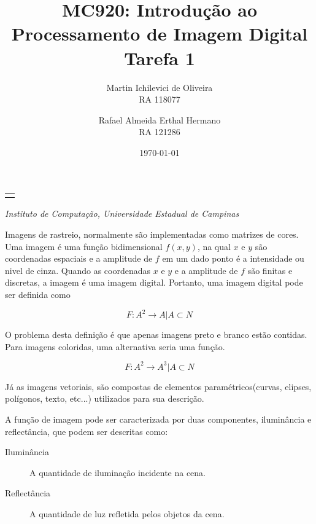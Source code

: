 \documentclass[10pt,a4paper]{article}
\makeatletter
\let\@institution\empty
\def\institution#1{\def\@institution{#1}}
\renewcommand{\maketitle}{
\begin{center}
  {\Large\bfseries\@title\par\medskip}
  {\large
   \begin{tabular}[t]{c}%
     \@author
   \end{tabular}\par\medskip}
  {\itshape\@institution\par}
  {\itshape\@date\par}
\end{center}}
\makeatother
\begin{document}

\title{MC920: Introdução ao Processamento de Imagem Digital\\Tarefa 1}
\author{
  \begin{minipage}{6cm}
  \centering
   Martin Ichilevici de Oliveira\\
   RA 118077
  \end{minipage}
   \and
  \begin{minipage}{6cm}
   \centering
   Rafael Almeida Erthal Hermano\\
   RA 121286
  \end{minipage}
  }
\institution{Instituto de Computação, Universidade Estadual de Campinas}
\date{\today}

\maketitle


Imagens de rastreio, normalmente são implementadas como matrizes de cores. Uma imagem é uma função bidimensional $f(x,y)$, na qual $x$ e $y$ são coordenadas espaciais e a amplitude de $f$ em um dado ponto é a intensidade ou nivel de cinza. Quando as coordenadas $x$ e $y$ e a amplitude de $f$ são finitas e discretas, a imagem é uma imagem digital. Portanto, uma imagem digital pode ser definida como

\[ F:A^2\rightarrow A | A \subset N \]

O problema desta definição é que apenas imagens preto e branco estão contidas. Para imagens coloridas, uma alternativa seria uma função.

\[ F:A^2\rightarrow A^3 | A \subset N \]

Já as imagens vetoriais, são compostas de elementos paramétricos(curvas, elipses, polígonos, texto, etc...) utilizados para sua descrição.

A função de imagem pode ser caracterizada por duas componentes, iluminância e reflectância, que podem ser descritas como:

\begin{description}
 \item[Iluminância] A quantidade de iluminação incidente na cena.
 \item[Reflectância] A quantidade de luz refletida pelos objetos da cena.
\end{description}
\end{document}
